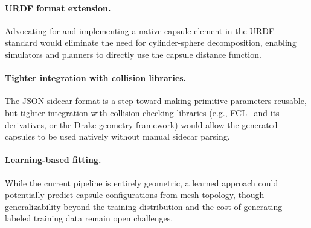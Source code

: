 \paragraph{URDF format extension.}
Advocating for and implementing a native capsule element in the URDF standard would eliminate the need for cylinder-sphere decomposition, enabling simulators and planners to directly use the capsule distance function.

\paragraph{Tighter integration with collision libraries.}
The JSON sidecar format is a step toward making primitive parameters reusable, but tighter integration with collision-checking libraries (e.g., FCL~\cite{pan2012fcl} and its derivatives, or the Drake geometry framework) would allow the generated capsules to be used natively without manual sidecar parsing.

\paragraph{Learning-based fitting.}
While the current pipeline is entirely geometric, a learned approach could potentially predict capsule configurations from mesh topology, though generalizability beyond the training distribution and the cost of generating labeled training data remain open challenges.
